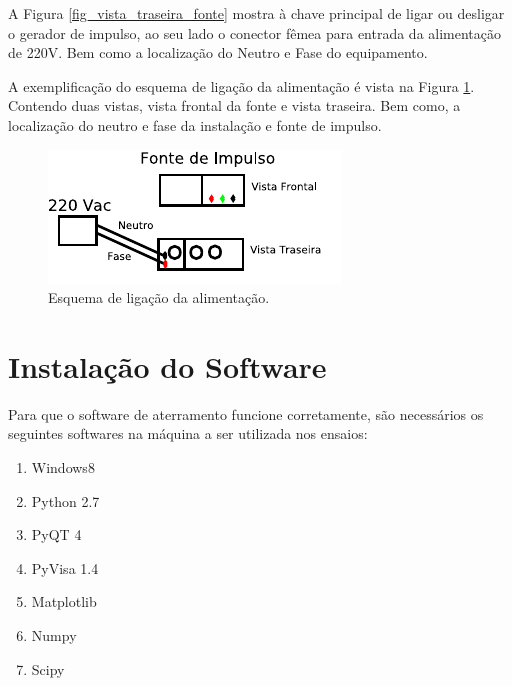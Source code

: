 \documentclass[a4paper, 10pt]{article}
\begin{document}
A Figura \ref{fig_vista_traseira_fonte} mostra à chave principal de ligar ou 
desligar o gerador de impulso, ao seu lado o conector fêmea para entrada da alimentação de 220V.
Bem como a localização do Neutro e Fase do equipamento. 


A exemplificação do esquema de ligação da alimentação é vista 
na Figura \ref{fig_esquema_ligacao_alimentacao}. Contendo duas vistas, vista frontal da fonte e vista
traseira. Bem como, a localização do neutro e fase da instalação e fonte de impulso.

\begin{figure}[!h]
        \caption{\label{fig_esquema_ligacao_alimentacao} Esquema de ligação da alimentação.}
	    \begin{center}
            \includegraphics[scale=1.2]{../fotos/conexoes/alimentacao.pdf}
	    \end{center}
\end{figure}




\section{Instalação do Software}

Para que o software de aterramento funcione corretamente, 
são necessários os seguintes softwares na máquina a ser utilizada nos ensaios:

\begin{enumerate}
    \item Windows8
    \item Python 2.7
    \item PyQT 4
    \item PyVisa 1.4
    \item Matplotlib
    \item Numpy
    \item Scipy
\end{enumerate}
\end{document}
